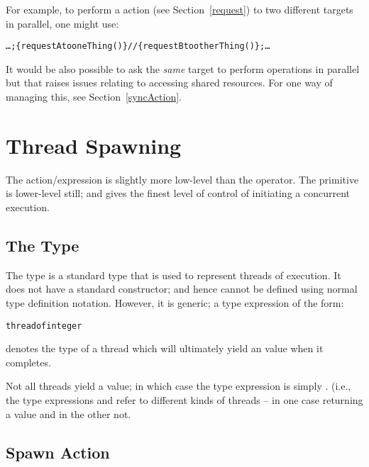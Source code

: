 For example, to perform a  action (see Section~\vref{request}) to two different targets in parallel, one might use:
\begin{alltt}
\ldots;\{ request A to oneThing() \}//\{request B to otherThing()\};\ldots
\end{alltt}
It would be also possible to ask the \emph{same} target to perform operations in parallel but that raises issues relating to accessing shared resources. For one way of managing this, see Section~\vref{syncAction}. %

\section{Thread Spawning}
\begin{aside}
The  action/expression is slightly more low-level than the \q{//} operator. The  primitive is lower-level still; and gives the finest level of control of initiating a concurrent execution.
\end{aside}

\subsection{The  Type}
\label{threadType}

The  type is a standard type that is used to represent threads of execution. It does not have a standard constructor; and hence cannot be defined using normal type definition notation. However, it is generic; a type expression of the form:
\begin{alltt}
thread of integer
\end{alltt}
denotes the type of a thread which will ultimately yield an  value when it completes. 

\begin{aside}
Not all threads yield a value; in which case the type expression is simply . (i.e., the type expressions  and  refer to different kinds of threads -- in one case returning a value and in the other not.
\end{aside}

\subsection{Spawn Action}
\label{spawnAction}


